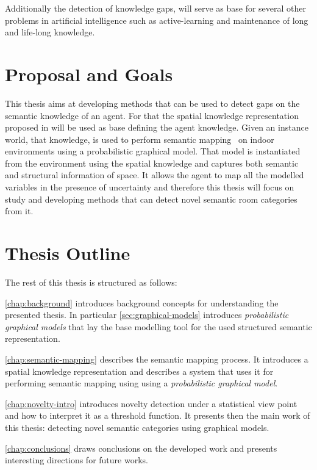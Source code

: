 Additionally the detection of knowledge gaps, will serve as base for several other problems in
artificial intelligence such as active-learning and maintenance of long and life-long knowledge.

\section{Proposal and Goals}
This thesis aims at developing methods that can be used to detect gaps on the semantic knowledge
of an agent. For that the spatial knowledge representation proposed in \cite{pronobis2010ias} will
be used as base defining the agent knowledge.
Given an instance world, that knowledge, is used to perform semantic mapping~\cite{pronobis2011semmap}
on indoor environments using a probabilistic graphical model. That model is instantiated from the
environment using the spatial knowledge and captures both semantic and structural information of
space. It allows the agent to map all the modelled variables in the presence of uncertainty and 
therefore this thesis will focus on study and developing methods that can detect novel semantic room
categories from it.

%


\section{Thesis Outline}
The rest of this thesis is structured as follows:

\autoref{chap:background} introduces background concepts for understanding the
presented thesis. In particular \autoref{sec:graphical-models} introduces
\emph{probabilistic graphical models} that lay the base modelling tool for
the used structured semantic representation.

\autoref{chap:semantic-mapping} describes the semantic mapping process.
It introduces a spatial knowledge representation and describes a system
that uses it for performing semantic mapping using using a \emph{probabilistic graphical model}.

\autoref{chap:novelty-intro} introduces novelty detection under a
statistical view point and how to interpret it as a threshold function.
It presents then the main work of this thesis: detecting novel semantic
categories using graphical models.

\autoref{chap:conclusions} draws conclusions on the developed work and presents
interesting directions for future works.



